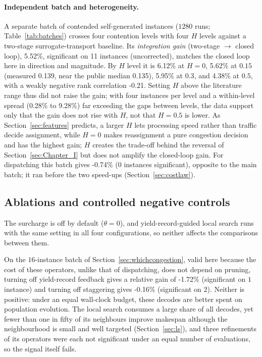 \documentclass[preprint,review,12pt,authoryear,doubleblind]{elsarticle}
\newcommand{\MatrixCells}{16}
\newcommand{\MatrixRuns}{1280}
\newcommand{\GainIntegMatrix}{5.52\%}    %
\newcommand{\SigIntegMatrix}{11}         %
\newcommand{\GainIntegMatrixLo}{0.28\%}
\newcommand{\GainIntegMatrixHi}{9.28\%}
\newcommand{\GainProbePre}{-0.74\%}      %
\newcommand{\GainCertMatrix}{-1.72\%}    %
\newcommand{\GainStaggerMatrix}{-0.16\%} %
\newcommand{\GainIntegHZero}{6.12\%}
\newcommand{\GainIntegHLow}{5.62\%}      %
\newcommand{\GainIntegHMid}{5.95\%}      %
\newcommand{\GainIntegHHigh}{4.38\%}     %
\newcommand{\MatrixHMeasLow}{0.139}      %
\newcommand{\RhoIntegH}{-0.21}           %
\newcommand{\PubHMed}{0.135}             %
\begin{document}
\paragraph{Independent batch and heterogeneity.}
A separate batch of contended self-generated instances ($\MatrixRuns$ runs; Table~\ref{tab:batches}) crosses four contention levels with four $H$ levels against a two-stage surrogate-transport baseline.
Its \emph{integration gain} (two-stage $\to$ closed loop), \GainIntegMatrix{}, significant on \SigIntegMatrix{} instances (uncorrected), matches the closed loop here in direction and magnitude.
By $H$ level it is \GainIntegHZero{} at $H=0$, \GainIntegHLow{} at $0.15$ (measured \MatrixHMeasLow{}, near the public median \PubHMed{}), \GainIntegHMid{} at $0.3$, and \GainIntegHHigh{} at $0.5$, with a weakly negative rank correlation \RhoIntegH{}.
Setting $H$ above the literature range thus did not raise the gain; with four instances per level and a within-level spread (\GainIntegMatrixLo{} to \GainIntegMatrixHi{}) far exceeding the gaps between levels, the data support only that the gain does not rise with $H$, not that $H=0.5$ is lower.
As Section~\ref{sec:features} predicts, a larger $H$ lets processing speed rather than traffic decide assignment, while $H=0$ makes reassignment a pure congestion decision and has the highest gain; $H$ creates the trade-off behind the reversal of Section~\ref{sec:Chapter_I} but does not amplify the closed-loop gain.
For dispatching this batch gives \GainProbePre{} ($0$ instances significant), opposite to the main batch; it ran before the two speed-ups (Section~\ref{sec:costlaw}).
\subsection{Ablations and controlled negative controls}
\label{sec:pricing}

The surcharge is off by default ($\theta=0$), and yield-record-guided local search runs with the same setting in all four configurations, so neither affects the comparisons between them.

On the $\MatrixCells$-instance batch of Section~\ref{sec:whichcongestion}, valid here because the cost of these operators, unlike that of dispatching, does not depend on pruning, turning off yield-record feedback gives a relative gain of \GainCertMatrix{} (significant on $1$ instance) and turning off staggering gives \GainStaggerMatrix{} (significant on $2$). Neither is positive: under an equal wall-clock budget, these decodes are better spent on population evolution. The local search consumes a large share of all decodes, yet fewer than one in fifty of its neighbours improve makespan although the neighbourhood is small and well targeted (Section~\ref{sec:ls}), and three refinements of its operators were each not significant under an equal number of evaluations, so the signal itself fails.
\end{document}
